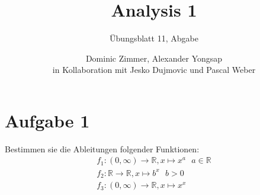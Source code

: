 \documentclass{scrreprt}
\newcommand{\RR}{\mathbb{R}}
\newcommand{\round}[1]{\left(#1\right)}
\begin{document}
	\title{Analysis 1}
 	\author{Dominic Zimmer, Alexander Yongsap\\in Kollaboration mit Jesko Dujmovic und Pascal Weber}
 	\subtitle{Übungsblatt 11, Abgabe}
 	\publishers{Übungsgruppe: Rami Ahmad}
  	\maketitle 


\section*{Aufgabe 1}
Bestimmen sie die Ableitungen folgender Funktionen:
\begin{align*}
    f_1 \colon \round{0,\infty} \to \RR, x \mapsto x^a ~~~ a \in \RR\\
    f_2 \colon \RR \to \RR, x \mapsto b^x~~~ b >0\\
    f_3 \colon \round{0,\infty} \to \RR, x \mapsto x^x
\end{align*}
\end{document}
